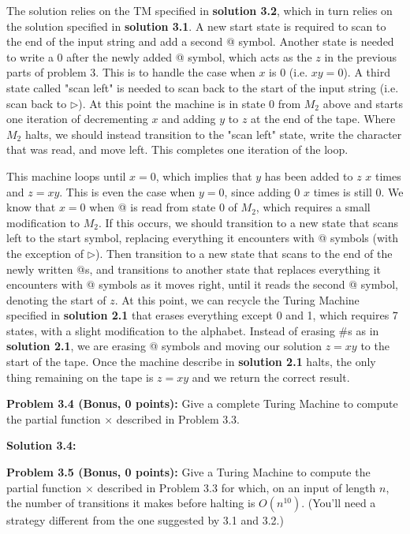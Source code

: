 \documentclass[11pt]{article}
\begin{document}
The solution relies on the TM specified in \textbf{solution 3.2}, which in turn relies on the solution specified in \textbf{solution 3.1}. A new start state is required to scan to the end of the input string and add a second @ symbol. Another state is needed to write a 0 after the newly added @ symbol, which acts as the $z$ in the previous parts of problem 3. This is to handle the case when $x$ is 0 (i.e. $xy = 0$). A third state called "scan left" is needed to scan back to the start of the input string (i.e. scan back to $\triangleright$). At this point the machine is in state 0 from $M_2$ above and starts one iteration of decrementing $x$ and adding $y$ to $z$ at the end of the tape. Where $M_2$ halts, we should instead transition to the "scan left" state, write the character that was read, and move left. This completes one iteration of the loop.

This machine loops until $x = 0$, which implies that $y$ has been added to $z$ $x$ times and $z = xy$. This is even the case when $y=0$, since adding 0 $x$ times is still 0. We know that $x=0$ when @ is read from state 0 of $M_2$, which requires a small modification to $M_2$. If this occurs, we should transition to a new state that scans left to the start symbol, replacing everything it encounters with @ symbols (with the exception of $\triangleright$). Then transition to a new state that scans to the end of the newly written @s, and transitions to another state that replaces everything it encounters with @ symbols as it moves right, until it reads the second @ symbol, denoting the start of $z$. At this point, we can recycle the Turing Machine specified in \textbf{solution 2.1} that erases everything except 0 and 1, which requires 7 states, with a slight modification to the alphabet. Instead of erasing $\#$s as in \textbf{solution 2.1}, we are erasing @ symbols and moving our solution $z=xy$ to the start of the tape. Once the machine describe in \textbf{solution 2.1} halts, the only thing remaining on the tape is $z=xy$ and we return the correct result.

\newpage

\textbf{Problem 3.4 (Bonus, 0 points):} Give a complete Turing Machine to compute the partial function $\times$ described in Problem 3.3.

\textbf{Solution 3.4:} 

\textbf{Problem 3.5 (Bonus, 0 points):} Give a Turing Machine to compute the partial function $\times$ described in Problem 3.3 for which, on an input of length $n$, the number of transitions it makes before halting is $O(n^{10})$. (You'll need a strategy different from the one suggested by 3.1 and 3.2.)
\end{document}

